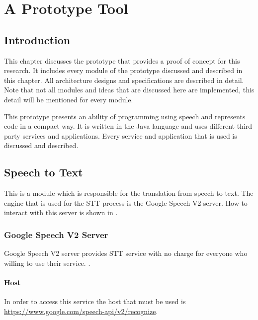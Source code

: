 \chapter{A Prototype Tool}
\section{Introduction}
This chapter discusses the prototype that provides a proof of concept for this research. It includes every module of the prototype discussed and described in this chapter. All architecture designs and specifications are described in detail. Note that not all modules and ideas that are discussed here are implemented, this detail will be mentioned for every module.

This prototype presents an ability of programming using speech and represents code in a compact way. It is written in the Java language and uses different third party services and applications. Every service and application that is used is discussed and described.

\section{Speech to Text}
This is a module which is responsible for the translation from speech to text. The engine that is used for the STT process is the Google Speech V2 server. How to interact with this server is shown in \citet{google15}  .
\subsection{Google Speech V2 Server}
Google Speech V2 server provides STT service with no charge for everyone who willing to use their service.
.
\subsubsection{Host}
In order to access this service the host that must be used is \url{https://www.google.com/speech-api/v2/recognize}.
